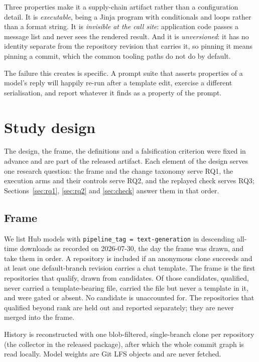 Three properties make it a supply-chain artifact rather than a configuration detail. It is
\emph{executable}, being a Jinja program with conditionals and loops rather than a format string. It
is \emph{invisible at the call site}: application code passes a message list and never sees the
rendered result. And it is \emph{unversioned}: it has no identity separate from the repository
revision that carries it, so pinning it means pinning a commit, which the common tooling paths do
not do by default.

The failure this creates is specific. A prompt suite that asserts properties of a model's reply will
happily re-run after a template edit, exercise a different serialisation, and report whatever it
finds as a property of the prompt.

\section{Study design}

The design, the frame, the definitions and a falsification criterion were fixed in advance and are
part of the released artifact. Each element of the design serves one research question: the frame
and the change taxonomy serve RQ1, the execution arms and their controls serve RQ2, and the
replayed check serves RQ3; Sections~\ref{sec:rq1}, \ref{sec:rq2} and \ref{sec:check} answer them in
that order.

\subsection{Frame}

We list Hub models with \texttt{pipeline\_tag = text-generation} in descending all-time downloads
as recorded on 2026-07-30, the day the frame was drawn, and take them in order. A repository is included if an anonymous clone succeeds and at least one
default-branch revision carries a chat template. The frame is the first \NFrame{} repositories that
qualify, drawn from \NCandidates{} candidates. Of those candidates, \NIncludedTotal{} qualified,
\NNoTemplateFile{} never carried a template-bearing file, \NNoTemplateRev{} carried the file but
never a template in it, and \NGated{} were gated or absent. No candidate is unaccounted for. The
\NOutOfFrame{} repositories that qualified beyond rank \NFrame{} are held out and reported
separately; they are never merged into the frame.

History is reconstructed with one blob-filtered, single-branch clone per repository (the collector
in the released package), after which the
whole commit graph is read locally. Model weights are Git LFS objects and are never fetched.

